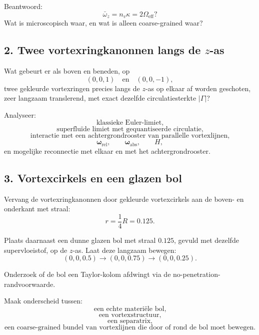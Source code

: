 \documentclass[11pt]{article}
\begin{document}
        Beantwoord:
        \[
            \bar{\omega}_z
            =
            n_v\kappa
            =
            2\Omega_{\mathrm{eff}}?
        \]
        Wat is microscopisch waar, en wat is alleen coarse-grained waar?
    
    \subsection{2. Twee vortexringkanonnen langs de \(z\)-as}
        
        Wat gebeurt er als boven en beneden, op
        \[
            (0,0,1)
            \quad\text{en}\quad
            (0,0,-1),
        \]
        twee gekleurde vortexringen precies langs de \(z\)-as op elkaar af worden geschoten, zeer langzaam translerend, met exact dezelfde circulatiesterkte \(|\Gamma|\)?
        
        Analyseer:
        \[
            \text{klassieke Euler-limiet,}
        \]
        \[
            \text{superfluïde limiet met gequantiseerde circulatie,}
        \]
        \[
            \text{interactie met een achtergrondrooster van parallelle vortexlijnen,}
        \]
        \[
            \boldsymbol{\omega}_{\mathrm{rel}},
            \qquad
            \boldsymbol{\omega}_{\mathrm{abs}},
            \qquad
            H,
        \]
        en mogelijke reconnectie met elkaar en met het achtergrondrooster.
    
    \subsection{3. Vortexcirkels en een glazen bol}
        
        Vervang de vortexringkanonnen door gekleurde vortexcirkels aan de boven- en onderkant met straal:
        \[
            r=\frac{1}{4}R=0.125.
        \]
        
        Plaats daarnaast een dunne glazen bol met straal \(0.125\), gevuld met dezelfde supervloeistof, op de \(z\)-as. Laat deze langzaam bewegen:
        \[
            (0,0,0.5)
            \rightarrow
            (0,0,0.75)
            \rightarrow
            (0,0,0.25).
        \]
        
        Onderzoek of de bol een Taylor-kolom afdwingt via de no-penetration-randvoorwaarde.
        
        Maak onderscheid tussen:
        \[
            \text{een echte materiële bol,}
        \]
        \[
            \text{een vortexstructuur,}
        \]
        \[
            \text{een separatrix,}
        \]
        \[
            \text{een coarse-grained bundel van vortexlijnen die door of rond de bol moet bewegen.}
        \]
        
\end{document}
